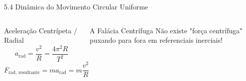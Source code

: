 \documentclass[10pt,aspectratio=169]{beamer}
\begin{document}
\begin{frame}{5.4 Dinâmica do Movimento Circular Uniforme}
    \begin{columns}[T]
        \begin{block}{Aceleração Centrípeta / Radial}
            \small
            $$a_{\text{rad}} = \frac{v^2}{R} = \frac{4\pi^2 R}{T^2}$$
            $$F_{\text{rad, resultante}} = m a_{\text{rad}} = m \frac{v^2}{R}$$
        \end{block}
        \begin{alertblock}{A Falácia Centrífuga}
            \small
            Não existe "força centrífuga" puxando para fora em referenciais inerciais!
        \end{alertblock}
        \begin{center}
        \end{center}
    \end{columns}
\end{frame}
\end{document}
